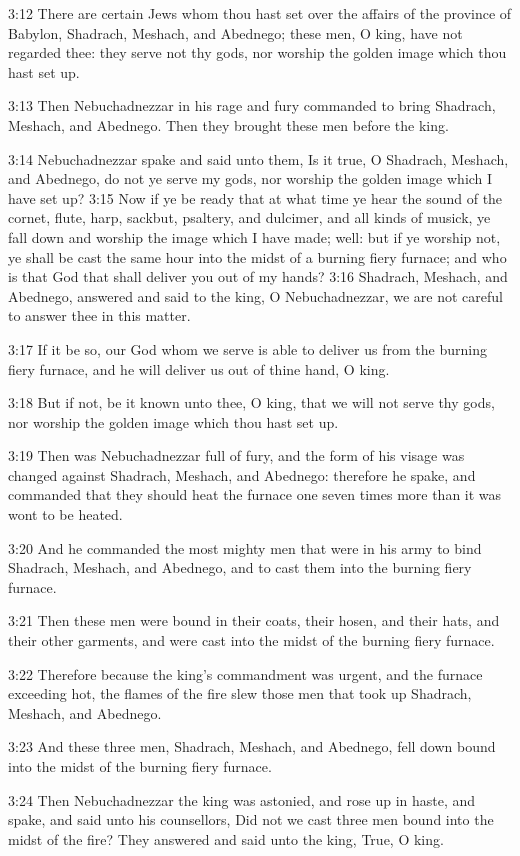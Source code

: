 3:12 There are certain Jews whom thou hast set over the affairs of the
province of Babylon, Shadrach, Meshach, and Abednego; these men, O
king, have not regarded thee: they serve not thy gods, nor worship the
golden image which thou hast set up.

3:13 Then Nebuchadnezzar in his rage and fury commanded to bring
Shadrach, Meshach, and Abednego. Then they brought these men before
the king.

3:14 Nebuchadnezzar spake and said unto them, Is it true, O Shadrach,
Meshach, and Abednego, do not ye serve my gods, nor worship the golden
image which I have set up?  3:15 Now if ye be ready that at what time
ye hear the sound of the cornet, flute, harp, sackbut, psaltery, and
dulcimer, and all kinds of musick, ye fall down and worship the image
which I have made; well: but if ye worship not, ye shall be cast the
same hour into the midst of a burning fiery furnace; and who is that
God that shall deliver you out of my hands?  3:16 Shadrach, Meshach,
and Abednego, answered and said to the king, O Nebuchadnezzar, we are
not careful to answer thee in this matter.

3:17 If it be so, our God whom we serve is able to deliver us from the
burning fiery furnace, and he will deliver us out of thine hand, O
king.

3:18 But if not, be it known unto thee, O king, that we will not serve
thy gods, nor worship the golden image which thou hast set up.

3:19 Then was Nebuchadnezzar full of fury, and the form of his visage
was changed against Shadrach, Meshach, and Abednego: therefore he
spake, and commanded that they should heat the furnace one seven times
more than it was wont to be heated.

3:20 And he commanded the most mighty men that were in his army to
bind Shadrach, Meshach, and Abednego, and to cast them into the
burning fiery furnace.

3:21 Then these men were bound in their coats, their hosen, and their
hats, and their other garments, and were cast into the midst of the
burning fiery furnace.

3:22 Therefore because the king's commandment was urgent, and the
furnace exceeding hot, the flames of the fire slew those men that took
up Shadrach, Meshach, and Abednego.

3:23 And these three men, Shadrach, Meshach, and Abednego, fell down
bound into the midst of the burning fiery furnace.

3:24 Then Nebuchadnezzar the king was astonied, and rose up in haste,
and spake, and said unto his counsellors, Did not we cast three men
bound into the midst of the fire? They answered and said unto the
king, True, O king.


